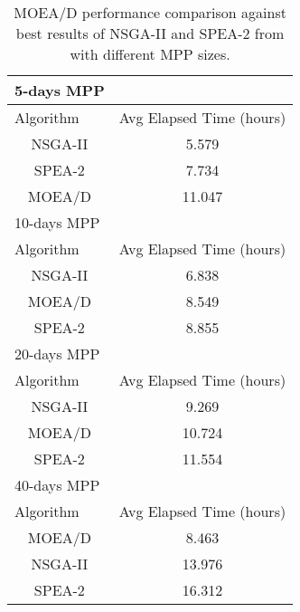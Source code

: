 \begin{table}[H]
\centering
\begin{tabular}{cc}
\hline
\multicolumn{1}{l}{\textbf{5-days MPP}} & \multicolumn{1}{l}{} \\ \hline
\multicolumn{1}{l}{Algorithm} & \multicolumn{1}{l}{Avg Elapsed Time (hours)} \\ \hline
NSGA-II & 5.579 \\
SPEA-2 & 7.734 \\
MOEA/D & 11.047 \\ \hline
\multicolumn{1}{l}{10-days MPP} & \multicolumn{1}{l}{} \\ \hline
\multicolumn{1}{l}{Algorithm} & \multicolumn{1}{l}{Avg Elapsed Time (hours)} \\ \hline
NSGA-II & 6.838 \\
MOEA/D & 8.549 \\
SPEA-2 & 8.855 \\ \hline
\multicolumn{1}{l}{20-days MPP} & \multicolumn{1}{l}{} \\ \hline
\multicolumn{1}{l}{Algorithm} & \multicolumn{1}{l}{Avg Elapsed Time (hours)} \\ \hline
NSGA-II & 9.269 \\
MOEA/D & 10.724 \\
SPEA-2 & 11.554 \\ \hline
\multicolumn{1}{l}{40-days MPP} & \multicolumn{1}{l}{} \\ \hline
\multicolumn{1}{l}{Algorithm} & \multicolumn{1}{l}{Avg Elapsed Time (hours)} \\ \hline
MOEA/D & 8.463 \\
NSGA-II & 13.976 \\
SPEA-2 & 16.312
\end{tabular}%
\caption{MOEA/D performance comparison against best results of NSGA-II and SPEA-2 from \cite{Miranda2018} with different MPP sizes.}
\label{table:time}
\end{table}